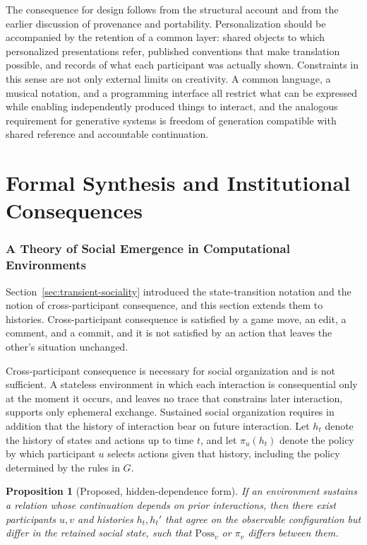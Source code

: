 \documentclass[11pt]{article}
\newtheorem{proposition}{Proposition}
\theoremstyle{remark}
\newcommand{\Gg}{G}
\begin{document}
The consequence for design follows from the structural account and from the earlier discussion of provenance and portability. Personalization should be accompanied by the retention of a common layer: shared objects to which personalized presentations refer, published conventions that make translation possible, and records of what each participant was actually shown. Constraints in this sense are not only external limits on creativity. A common language, a musical notation, and a programming interface all restrict what can be expressed while enabling independently produced things to interact, and the analogous requirement for generative systems is freedom of generation compatible with shared reference and accountable continuation.

\part{Formal Synthesis and Institutional Consequences}

\section{A Theory of Social Emergence in Computational Environments}
\label{sec:formal}

Section~\ref{sec:transient-sociality} introduced the state-transition notation and the notion of cross-participant consequence, and this section extends them to histories. Cross-participant consequence is satisfied by a game move, an edit, a comment, and a commit, and it is not satisfied by an action that leaves the other's situation unchanged.

Cross-participant consequence is necessary for social organization and is not sufficient. A stateless environment in which each interaction is consequential only at the moment it occurs, and leaves no trace that constrains later interaction, supports only ephemeral exchange. Sustained social organization requires in addition that the history of interaction bear on future interaction. Let $h_t$ denote the history of states and actions up to time $t$, and let $\pi_u(h_t)$ denote the policy by which participant $u$ selects actions given that history, including the policy determined by the rules in $\Gg$.

\begin{proposition}[Proposed, hidden-dependence form]
If an environment sustains a relation whose continuation depends on prior interactions, then there exist participants $u,v$ and histories $h_t, h_t'$ that agree on the observable configuration but differ in the retained social state, such that $\mathrm{Poss}_v$ or $\pi_v$ differs between them.
\end{proposition}
\end{document}
